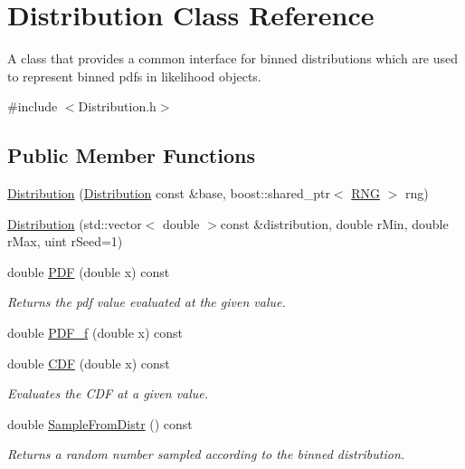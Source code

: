 \hypertarget{classDistribution}{\section{Distribution Class Reference}
\label{classDistribution}
}


A class that provides a common interface for binned distributions which are used to represent binned pdfs in likelihood objects.  




{\ttfamily \#include $<$Distribution.\-h$>$}

\subsection*{Public Member Functions}
\begin{DoxyCompactItemize}
\item 
\hyperlink{classDistribution_a7671d190019f4e6d1014a561a9e3cc65}{Distribution} (\hyperlink{classDistribution}{Distribution} const \&base, boost\-::shared\-\_\-ptr$<$ \hyperlink{classRNG}{R\-N\-G} $>$ rng)
\item 
\hyperlink{classDistribution_a2ee6e69ceb1df2813df56c6883cbb326}{Distribution} (std\-::vector$<$ double $>$const \&distribution, double r\-Min, double r\-Max, uint r\-Seed=1)
\item 
double \hyperlink{classDistribution_a26a55e9b524f94fb5c75e3c8abe96ecd}{P\-D\-F} (double x) const 
\begin{DoxyCompactList}\small\item\em Returns the pdf value evaluated at the given value. \end{DoxyCompactList}\item 
double \hyperlink{classDistribution_a94a970330e540c2061d6c05dc9f60f1d}{P\-D\-F\-\_\-f} (double x) const 
\item 
double \hyperlink{classDistribution_ac852b7915ba69e2d8f9cee0e5dab68b5}{C\-D\-F} (double x) const 
\begin{DoxyCompactList}\small\item\em Evaluates the C\-D\-F at a given value. \end{DoxyCompactList}\item 
double \hyperlink{classDistribution_a503ae8b2d80c3c26a8c9a255c59761f2}{Sample\-From\-Distr} () const 
\begin{DoxyCompactList}\small\item\em Returns a random number sampled according to the binned distribution. \end{DoxyCompactList}\item 

\end{DoxyCompactItemize}
